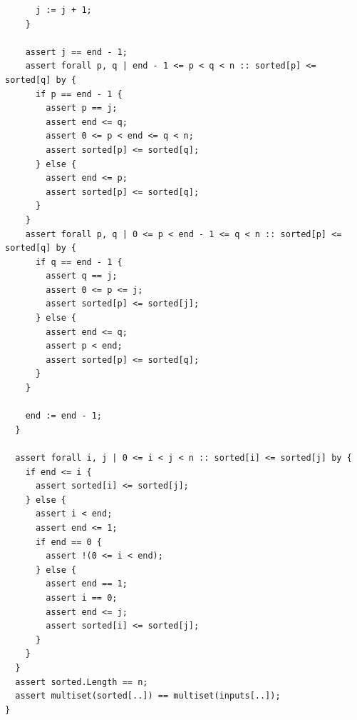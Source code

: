 \documentclass{article}
\begin{document}
\begin{lstlisting}
      j := j + 1;
    }

    assert j == end - 1;
    assert forall p, q | end - 1 <= p < q < n :: sorted[p] <= sorted[q] by {
      if p == end - 1 {
        assert p == j;
        assert end <= q;
        assert 0 <= p < end <= q < n;
        assert sorted[p] <= sorted[q];
      } else {
        assert end <= p;
        assert sorted[p] <= sorted[q];
      }
    }
    assert forall p, q | 0 <= p < end - 1 <= q < n :: sorted[p] <= sorted[q] by {
      if q == end - 1 {
        assert q == j;
        assert 0 <= p <= j;
        assert sorted[p] <= sorted[j];
      } else {
        assert end <= q;
        assert p < end;
        assert sorted[p] <= sorted[q];
      }
    }

    end := end - 1;
  }

  assert forall i, j | 0 <= i < j < n :: sorted[i] <= sorted[j] by {
    if end <= i {
      assert sorted[i] <= sorted[j];
    } else {
      assert i < end;
      assert end <= 1;
      if end == 0 {
        assert !(0 <= i < end);
      } else {
        assert end == 1;
        assert i == 0;
        assert end <= j;
        assert sorted[i] <= sorted[j];
      }
    }
  }
  assert sorted.Length == n;
  assert multiset(sorted[..]) == multiset(inputs[..]);
}
\end{lstlisting}
\end{document}
